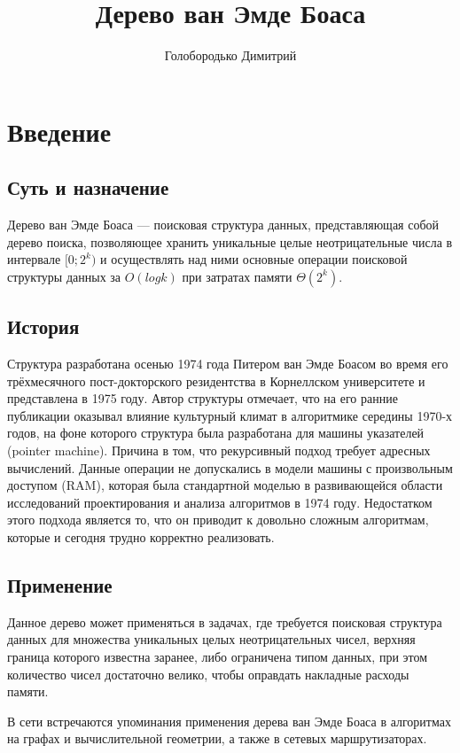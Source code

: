 \documentclass{article}
\title{Дерево ван Эмде Боаса}
\author{Голобородько Димитрий}
\begin{document}
\maketitle


\section{Введение}
\subsection{Суть и назначение}

Дерево ван Эмде Боаса — поисковая структура данных, представляющая собой дерево поиска, позволяющее хранить уникальные целые неотрицательные числа в интервале $[0;2^k)$ и осуществлять над ними основные операции поисковой структуры данных за $O(log{k})$ при затратах памяти $\Theta(2^k)$.
\subsection{История}

Структура разработана осенью 1974 года Питером ван Эмде Боасом во время его трёхмесячного пост-докторского резидентства в Корнеллском университете и представлена в 1975 году. Автор структуры отмечает, что на его ранние публикации оказывал влияние культурный климат в алгоритмике середины 1970-х годов, на фоне которого структура была разработана для машины указателей (pointer machine). Причина в том, что рекурсивный подход требует адресных вычислений. Данные операции не допускались в модели машины с произвольным доступом (RAM), которая была стандартной моделью в развивающейся области исследований проектирования и анализа алгоритмов в 1974 году. Недостатком этого подхода является то, что он приводит к довольно сложным алгоритмам, которые и сегодня трудно корректно реализовать. \cite{history}
\subsection{Применение}

Данное дерево может применяться в задачах, где требуется поисковая структура данных для множества уникальных целых неотрицательных чисел, верхняя граница которого известна заранее, либо ограничена типом данных, при этом количество чисел достаточно велико, чтобы оправдать накладные расходы памяти. \cite{wikipedia}

В сети встречаются упоминания применения дерева ван Эмде Боаса в алгоритмах на графах и вычислительной геометрии, а также в сетевых маршрутизаторах. \cite{history}
\end{document}
